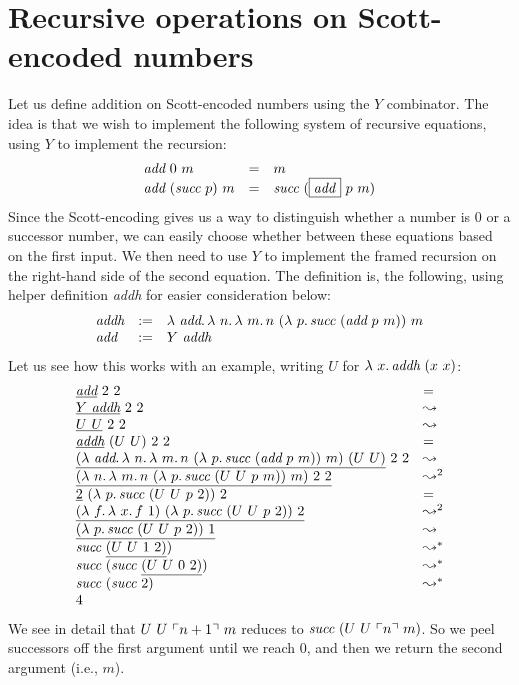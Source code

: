 \section{Recursive operations on Scott-encoded numbers}

Let us define addition on Scott-encoded numbers using the $Y$ combinator.  The idea is that we wish to implement the following
system of recursive equations, using $Y$ to implement the recursion:
\[
\begin{array}{lll}
  \textit{add}\ 0\ m & = & m \\
  \textit{add}\ (\textit{succ}\ p)\ m & = & \textit{succ}\ (\fbox{\textit{add}}\ p\ m)
\end{array}
\]
\noindent Since the Scott-encoding gives us a way to distinguish whether a number is $0$ or a successor number, we can
easily choose whether between these equations based on the first input.  We then need to use $Y$ to implement the framed
recursion on the right-hand side of the second equation.  The definition is, the following, using helper definition \textit{addh} for
easier consideration below:
\[
\begin{array}{lll}
  \textit{addh} & := & \lam{\textit{add}}{\lam{n}{\lam{m}{n\ (\lam{p}{\textit{succ}\ (\textit{add}\ p\ m)})\ m}}} \\
  \textit{add} & := & Y\ \textit{addh}
  \end{array}
\]
\noindent Let us see how this works with an example, writing $U$ for $\lambda\ x.\, \textit{addh}\ (x\ x)$:
\[
\begin{array}{ll}
  \underline{\textit{add}}\ 2\ 2 & = \\
  \underline{Y\ \textit{addh}}\ 2\ 2 & \leadsto \\
  \underline{U\ U}\ 2\ 2 & \leadsto \\  
  \underline{\textit{addh}}\ (U\ U)\ 2\ 2 & = \\
  \underline{(\lam{\textit{add}}{\lam{n}{\lam{m}{n\ (\lam{p}{\textit{succ}\ (\textit{add}\ p\ m)})\ m}}})\ (U\ U)}\ 2\ 2 & \leadsto \\  
  \underline{(\lam{n}{\lam{m}{n\ (\lam{p}{\textit{succ}\ (U\ U\ p\ m)})\ m}})\ 2\ 2} & \leadsto^2 \\
  \underline{2}\ (\lam{p}{\textit{succ}\ (U\ U\ p\ 2)})\ 2 & = \\
  \underline{(\lam{f}{\lam{x}{f\ 1}})\ (\lam{p}{\textit{succ}\ (U\ U\ p\ 2)})\ 2} & \leadsto^2 \\
  \underline{(\lam{p}{\textit{succ}\ (U\ U\ p\ 2)})\ 1} & \leadsto \\
  \textit{succ}\ \underline{(U\ U\ 1\ 2)}) & \leadsto^* \\
  \textit{succ}\ (\textit{succ}\ \underline{(U\ U\ 0\ 2)}) & \leadsto^* \\
  \textit{succ}\ (\textit{succ}\ 2) & \leadsto^* \\
  4 &\ 
  \end{array}
\]
\noindent We see in detail that $U\ U\ \ulcorner n+1 \urcorner\ m$ reduces to
$\textit{succ}\ (U\ U\ \ulcorner n \urcorner\ m)$.  So we peel successors off the
first argument until we reach $0$, and then we return the second
argument (i.e., $m$).

